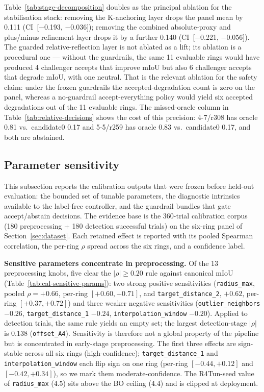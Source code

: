 \documentclass[a4paper,fleqn]{cas-dc}
\begin{document}
Table~\ref{tab:stage-decomposition} doubles as the principal ablation for the stabilisation stack: removing the K-anchoring layer drops the panel mean by 0.111 (CI~[$-$0.193, $-$0.036]); removing the combined absolute-proxy and plus/minus refinement layer drops it by a further 0.140 (CI~[$-$0.221, $-$0.056]). The guarded relative-reflection layer is not ablated as a lift; its ablation is a procedural one — without the guardrails, the same 11 evaluable rings would have produced 4 challenger accepts that improve mIoU but also 6 challenger accepts that degrade mIoU, with one neutral. That is the relevant ablation for the safety claim: under the frozen guardrails the accepted-degradation count is zero on the panel, whereas a no-guardrail accept-everything policy would yield six accepted degradations out of the 11 evaluable rings. The missed-oracle column in Table~\ref{tab:relative-decisions} shows the cost of this precision: 4-7/r308 has oracle 0.81 vs.\ candidate0 0.17 and 5-5/r259 has oracle 0.83 vs.\ candidate0 0.17, and both are abstained.


\subsection{Parameter sensitivity}\label{sec:sensitivity}

This subsection reports the calibration outputs that were frozen before held-out evaluation: the bounded set of tunable parameters, the diagnostic intrinsics available to the label-free controller, and the guardrail bundles that gate accept/abstain decisions. The evidence base is the 360-trial calibration corpus (180 preprocessing + 180 detection successful trials) on the six-ring panel of Section~\ref{sec:dataset}. Each retained effect is reported with its pooled Spearman correlation, the per-ring $\rho$ spread across the six rings, and a confidence label.



\textbf{Sensitive parameters concentrate in preprocessing.} Of the 13 preprocessing knobs, five clear the $|\rho| \geq 0.20$ rule against canonical mIoU (Table~\ref{tab:cal-sensitive-params}): two strong positive sensitivities (\texttt{radius\_max}, pooled $\rho = +0.66$, per-ring $[+0.60, +0.71]$, and \texttt{target\_distance\_2}, $+0.62$, per-ring $[+0.37, +0.72]$) and three weaker negative sensitivities (\texttt{outlier\_neighbors} $-0.26$, \texttt{target\_distance\_1} $-0.24$, \texttt{interpolation\_window} $-0.20$). Applied to detection trials, the same rule yields an empty set; the largest detection-stage $|\rho|$ is 0.138 (\texttt{offset\_A4}). Sensitivity is therefore not a global property of the pipeline but is concentrated in early-stage preprocessing. The first three effects are sign-stable across all six rings (high-confidence); \texttt{target\_distance\_1} and \texttt{interpolation\_window} each flip sign on one ring (per-ring $[-0.44, +0.12]$ and $[-0.42, +0.34]$), so we mark them moderate-confidence. The R4Tun-seed value of \texttt{radius\_max} (4.5) sits above the BO ceiling (4.4) and is clipped at deployment.
\end{document}
